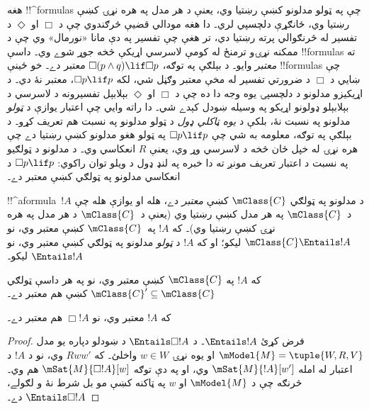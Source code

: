 \documentclass[../../../include/open-logic-section]{subfiles}
\begin{document}


\begin{explain}
  هغه !!^{formula}s چې په ټولو مدلونو کښې رښتيا وي، يعنې د هر مدل
  په هره نړۍ کښې رښتيا وي، ځانګړې دلچسپي لري۔ دا هغه مودالي قضيې
  څرګندوي چې د $\Box$ او $\Diamond$ د تفسير له څرنګوالي پرته رښتيا
  دي، تر هغې چې تفسير په دې مانا «نورمال» وي چې د ممکنه نړۍو ترمنځ
  له کومې لاسرسي اړيکې څخه جوړ شوے وي۔ داسې !!{formula}s ته
  \emph{معتبر} وايو۔ د بېلګې په توګه، $\Box(p \land q) \lif \Box p$
  معتبر دے۔ خو ځينې !!{formula}s چې ښايي د $\Box$ د ضرورتي تفسير له
  مخې معتبر وګڼل شي، لکه $\Box p \lif p$، معتبر نۀ دي۔ د اړيکيزو
  مدلونو د دلچسپۍ يوه وجه دا ده چې د $\Box$ او $\Diamond$ بېلابېل
  تفسيرونه د لاسرسي د بېلابېلو ډولونو اړيکو په وسيله ښودل کېدے شي۔
  دا راته وايي چې اعتبار يوازې د \emph{ټولو} مدلونو په نسبت نۀ، بلکې
  د \emph{يوه ټاکلي ډول} د ټولو مدلونو په نسبت هم تعريف کړو۔ د بېلګې
  په توګه، معلومه به شي چې $\Box p \lif p$ په ټولو هغو مدلونو کښې
  رښتيا دے چې هره نړۍ له خپل ځان څخه د لاسرسي وړ وي، يعنې $R$
  انعکاسي وي۔ د مدلونو د ټولګيو په نسبت د اعتبار تعريف مونږ ته دا
  خبره په لنډ ډول د ويلو توان راکوي: $\Box p \lif p$ د انعکاسي
  مدلونو په ټولګي کښې معتبر دے۔
\end{explain}

\begin{defn}
  !!^a{formula}~$!A$ د مدلونو په ټولګي $\mClass{C}$ کښې \emph{معتبر}
  دے، هله او يوازې هله چې د~$\mClass{C}$ په هر مدل کښې رښتيا وي (يعنې د~$\mClass{C}$
  د هر مدل په هره نړۍ کښې رښتيا وي)۔ که $!A$ په~$\mClass{C}$ کښې
  معتبر وي، نو $\mClass{C} \Entails !A$ ليکو؛ او که $!A$ د
  \emph{ټولو} مدلونو په ټولګي کښې معتبر وي، نو $\Entails !A$ ليکو۔
\end{defn}

\begin{prop}
  که $!A$ په $\mClass{C}$ کښې معتبر وي، نو په هر داسې ټولګي
  $\mClass{C}' \subseteq \mClass{C}$ کښې هم معتبر دے۔
\end{prop}

\begin{prop}
  که $!A$ معتبر وي، نو $\Box!A$ هم معتبر دے۔
\end{prop}

\begin{proof}
  فرض کړئ $\Entails !A$۔ د $\Entails \Box!A$ د ښودلو دپاره يو
  مدل $\mModel{M} = \tuple{W, R, V}$ او يوه نړۍ $w \in W$ واخلئ۔
  که $Rww'$ وي، نو د $!A$ د اعتبار له امله $\mSat{M}{!A}[w']$ وي،
  او په دې توګه $\mSat{M}{\Box!A}[w]$ هم وي۔ څرنګه چې د
  $\mModel{M}$ او $w$ په ټاکنه کښې مو بل شرط نۀ و لګولے، $\Entails \Box!A$ دے۔
\end{proof}
\end{document}
